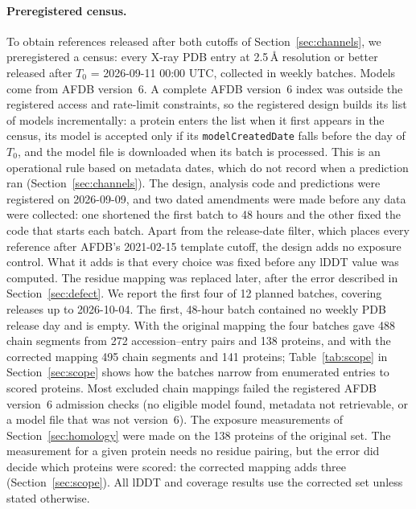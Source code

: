 \documentclass{article}
\begin{document}
\paragraph{Preregistered census.} To obtain references released after both cutoffs of Section~\ref{sec:channels}, we preregistered a census: every X-ray PDB entry at
2.5\,\AA{} resolution or better released after $T_0$ = 2026-09-11 00:00 UTC,
collected in weekly batches. Models come from AFDB version~6. A complete AFDB version~6 index was outside the registered access and rate-limit constraints, so the registered design builds its list of models incrementally: a protein enters the list when it first appears in the census, its model is accepted only if its \texttt{modelCreatedDate} falls before the day of $T_0$, and the model file is downloaded when its batch is processed. This is an operational rule based on metadata dates, which do not record when a prediction ran (Section~\ref{sec:channels}). The design, analysis code and predictions were registered on
2026-09-09, and two dated amendments were made before any data were
collected: one shortened the first batch to 48 hours and the other fixed the
code that starts each batch. Apart from the release-date filter, which
places every reference after AFDB's 2021-02-15 template cutoff, the design
adds no exposure control. What it adds is that every choice was fixed before
any lDDT value was computed. The residue mapping was replaced later, after
the error described in Section~\ref{sec:defect}. We report the first four of
12 planned batches, covering releases up to 2026-10-04. The first, 48-hour
batch contained no weekly PDB release day and is empty. With the original
mapping the four batches gave 488 chain segments from 272 accession--entry
pairs and 138 proteins, and with the corrected mapping 495 chain segments
and 141 proteins; Table~\ref{tab:scope} in Section~\ref{sec:scope} shows how the batches narrow from enumerated entries to scored proteins. Most excluded chain mappings failed the registered AFDB version~6 admission checks (no eligible model found, metadata not retrievable, or a model file that was not version~6). The exposure measurements of Section~\ref{sec:homology} were made on the 138 proteins of the original set. The measurement for a given protein needs no residue pairing, but the error did decide which proteins were scored: the corrected mapping adds three (Section~\ref{sec:scope}). All lDDT and coverage results use the corrected set unless stated otherwise.
\end{document}
